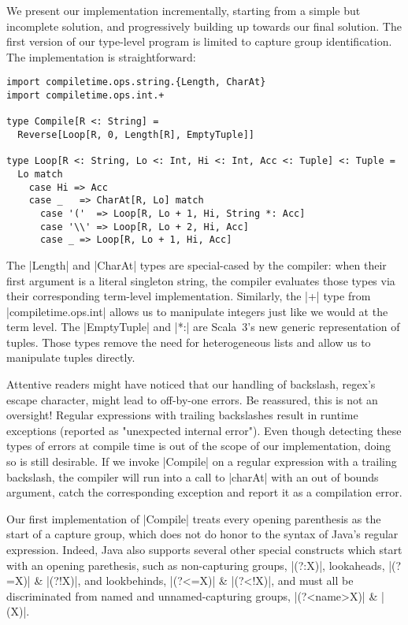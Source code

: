 We present our implementation incrementally, starting from a simple but incomplete solution, and progressively building up towards our final solution.
The first version of our type-level program is limited to capture group identification.
The implementation is straightforward:

\begin{lstlisting}
import compiletime.ops.string.{Length, CharAt}
import compiletime.ops.int.+

type Compile[R <: String] =
  Reverse[Loop[R, 0, Length[R], EmptyTuple]]

type Loop[R <: String, Lo <: Int, Hi <: Int, Acc <: Tuple] <: Tuple =
  Lo match
    case Hi => Acc
    case _   => CharAt[R, Lo] match
      case '('  => Loop[R, Lo + 1, Hi, String *: Acc]
      case '\\' => Loop[R, Lo + 2, Hi, Acc]
      case _ => Loop[R, Lo + 1, Hi, Acc]
\end{lstlisting}

\noindent
The |Length| and |CharAt| types are special-cased by the compiler: when their first argument is a literal singleton string, the compiler evaluates those types via their corresponding term-level implementation.
Similarly, the |+| type from |compiletime.ops.int| allows us to manipulate integers just like we would at the term level.
The |EmptyTuple| and |*:| are Scala~3's new generic representation of tuples.
Those types remove the need for heterogeneous lists and allow us to manipulate tuples directly.

Attentive readers might have noticed that our handling of backslash, regex's escape character, might lead to off-by-one errors.
Be reassured, this is not an oversight!
Regular expressions with trailing backslashes result in runtime exceptions (reported as "unexpected internal error").
Even though detecting these types of errors at compile time is out of the scope of our implementation, doing so is still desirable.
If we invoke |Compile| on a regular expression with a trailing backslash, the compiler will run into a call to |charAt| with an out of bounds argument, catch the corresponding exception and report it as a compilation error.

Our first implementation of |Compile| treats every opening parenthesis as the start of a capture group, which does not do honor to the syntax of Java's regular expression.
Indeed, Java also supports several other special constructs which start with an opening parethesis, such as non-capturing groups, |(?:X)|, lookaheads, |(?=X)| \& |(?!X)|, and lookbehinds, |(?<=X)| \& |(?<!X)|, and must all be discriminated from named and unnamed-capturing groups, |(?<name>X)| \& |(X)|.

